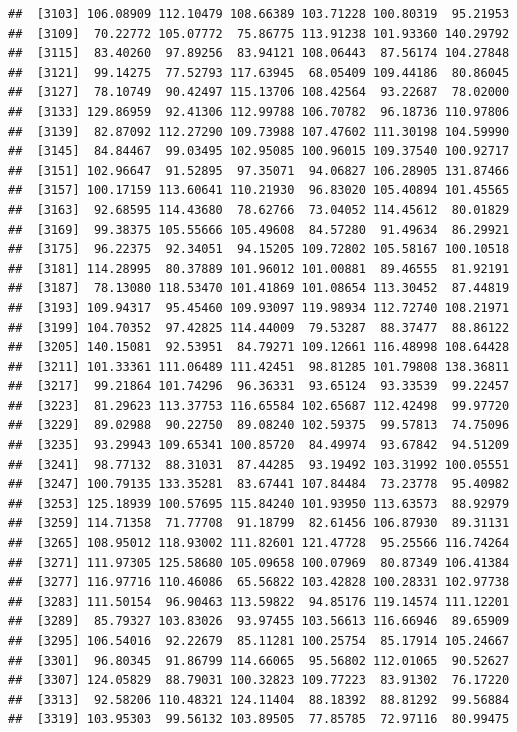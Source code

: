 \documentclass[
]{article}
\begin{document}
\begin{verbatim}
##  [3103] 106.08909 112.10479 108.66389 103.71228 100.80319  95.21953
##  [3109]  70.22772 105.07772  75.86775 113.91238 101.93360 140.29792
##  [3115]  83.40260  97.89256  83.94121 108.06443  87.56174 104.27848
##  [3121]  99.14275  77.52793 117.63945  68.05409 109.44186  80.86045
##  [3127]  78.10749  90.42497 115.13706 108.42564  93.22687  78.02000
##  [3133] 129.86959  92.41306 112.99788 106.70782  96.18736 110.97806
##  [3139]  82.87092 112.27290 109.73988 107.47602 111.30198 104.59990
##  [3145]  84.84467  99.03495 102.95085 100.96015 109.37540 100.92717
##  [3151] 102.96647  91.52895  97.35071  94.06827 106.28905 131.87466
##  [3157] 100.17159 113.60641 110.21930  96.83020 105.40894 101.45565
##  [3163]  92.68595 114.43680  78.62766  73.04052 114.45612  80.01829
##  [3169]  99.38375 105.55666 105.49608  84.57280  91.49634  86.29921
##  [3175]  96.22375  92.34051  94.15205 109.72802 105.58167 100.10518
##  [3181] 114.28995  80.37889 101.96012 101.00881  89.46555  81.92191
##  [3187]  78.13080 118.53470 101.41869 101.08654 113.30452  87.44819
##  [3193] 109.94317  95.45460 109.93097 119.98934 112.72740 108.21971
##  [3199] 104.70352  97.42825 114.44009  79.53287  88.37477  88.86122
##  [3205] 140.15081  92.53951  84.79271 109.12661 116.48998 108.64428
##  [3211] 101.33361 111.06489 111.42451  98.81285 101.79808 138.36811
##  [3217]  99.21864 101.74296  96.36331  93.65124  93.33539  99.22457
##  [3223]  81.29623 113.37753 116.65584 102.65687 112.42498  99.97720
##  [3229]  89.02988  90.22750  89.08240 102.59375  99.57813  74.75096
##  [3235]  93.29943 109.65341 100.85720  84.49974  93.67842  94.51209
##  [3241]  98.77132  88.31031  87.44285  93.19492 103.31992 100.05551
##  [3247] 100.79135 133.35281  83.67441 107.84484  73.23778  95.40982
##  [3253] 125.18939 100.57695 115.84240 101.93950 113.63573  88.92979
##  [3259] 114.71358  71.77708  91.18799  82.61456 106.87930  89.31131
##  [3265] 108.95012 118.93002 111.82601 121.47728  95.25566 116.74264
##  [3271] 111.97305 125.58680 105.09658 100.07969  80.87349 106.41384
##  [3277] 116.97716 110.46086  65.56822 103.42828 100.28331 102.97738
##  [3283] 111.50154  96.90463 113.59822  94.85176 119.14574 111.12201
##  [3289]  85.79327 103.83026  93.97455 103.56613 116.66946  89.65909
##  [3295] 106.54016  92.22679  85.11281 100.25754  85.17914 105.24667
##  [3301]  96.80345  91.86799 114.66065  95.56802 112.01065  90.52627
##  [3307] 124.05829  88.79031 100.32823 109.77223  83.91302  76.17220
##  [3313]  92.58206 110.48321 124.11404  88.18392  88.81292  99.56884
##  [3319] 103.95303  99.56132 103.89505  77.85785  72.97116  80.99475

\end{verbatim}
\end{document}
